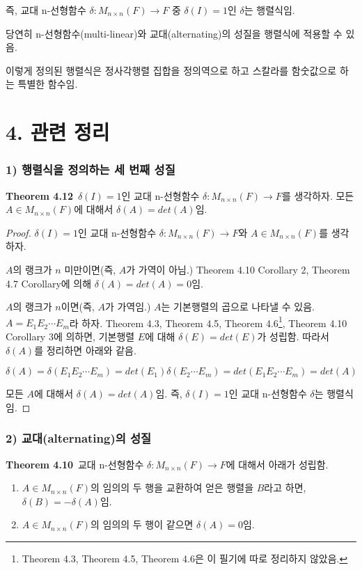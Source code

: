 즉, 교대 n-선형함수 $\delta:M_{n \times n}(F) \rightarrow F$ 중 $\delta(I)=1$인 $\delta$는 행렬식임.

당연히 n-선형함수(multi-linear)와 교대(alternating)의 성질을 행렬식에 적용할 수 있음.

이렇게 정의된 행렬식은 정사각행렬 집합을 정의역으로 하고 스칼라를 함숫값으로 하는 특별한 함수임.\\


\section*{4. 관련 정리}
\subsubsection*{1) 행렬식을 정의하는 세 번째 성질}
\textbf{Theorem 4.12}\, $\delta(I)=1$인 교대 n-선형함수 $\delta:M_{n \times n}(F) \rightarrow F$를 생각하자. 모든 $A \in M_{n \times n}(F)$에 대해서 $\delta(A)=det(A)$임.

\begin{proof}
$\delta(I)=1$인 교대 n-선형함수 $\delta:M_{n \times n}(F) \rightarrow F$와 $A \in M_{n \times n}(F)$를 생각하자.

$A$의 랭크가 $n$ 미만이면(즉, $A$가 가역이 아님.) Theorem 4.10 Corollary 2, Theorem 4.7 Corollary에 의해 $\delta(A)=det(A)=0$임.

$A$의 랭크가 $n$이면(즉, $A$가 가역임.) $A$는 기본행렬의 곱으로 나타낼 수 있음. $A=E_1E_2 \cdots E_m$라 하자. 
Theorem 4.3, Theorem 4.5, Theorem 4.6\footnote{Theorem 4.3, Theorem 4.5, Theorem 4.6은 이 필기에 따로 정리하지 않았음.}, Theorem 4.10 Corollary 3에 의하면, 기본행렬 $E$에 대해 $\delta(E)=det(E)$가 성립함. 따라서 $\delta(A)$를 정리하면 아래와 같음.

\[
\delta(A)=\delta(E_1E_2 \cdots E_m)=det(E_1)\delta(E_2 \cdots E_m)=det(E_1E_2 \cdots E_m)=det(A)
\]

모든 $A$에 대해서 $\delta(A)=det(A)$임. 즉, $\delta(I)=1$인 교대 n-선형함수 $\delta$는 행렬식임.
\end{proof}


\newpage


\subsubsection*{2) 교대(alternating)의 성질}
\textbf{Theorem 4.10}\, 교대 n-선형함수 $\delta:M_{n \times n}(F) \rightarrow F$에 대해서 아래가 성립함.

\begin{enumerate}
    \item $A \in M_{n \times n}(F)$의 임의의 두 행을 교환하여 얻은 행렬을 $B$라고 하면, $\delta(B)=-\delta(A)$임.
    \item $A \in M_{n \times n}(F)$의 임의의 두 행이 같으면 $\delta(A)=0$임.
\end{enumerate}

